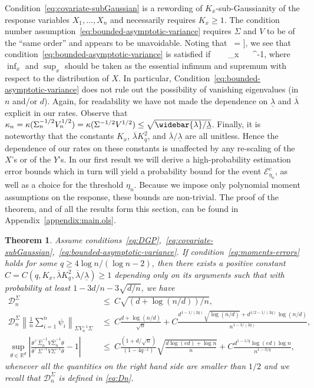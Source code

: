\documentclass{article}
\newtheorem{theorem}{Theorem}
\begin{document}
Condition~\ref{eq:covariate-subGaussian} is a rewording of $K_x$-sub-Gaussianity of the response variables $X_1, \ldots, X_n$ and necessarily requires $K_x \ge 1$. The condition number assumption~\ref{eq:bounded-asymptotic-variance} requires $\Sigma$ and $V$ to be of the ``same order'' and appears to be unavoidable.
Noting that
\ = \left\right],
\]
we see that condition~\ref{eq:bounded-asymptotic-variance} is satisfied if
\ ~\le~ \sup_{x} ~\le~ \underline{\lambda}^{-1},
\]
where $\inf_x$ and $\sup_x$ should be taken as the essential infimum and supremum with respect to the distribution of $X$.
In particular, Condition~\ref{eq:bounded-asymptotic-variance} does not rule out the possibility of vanishing eigenvalues (in $n$ and/or $d$). Again, for readability we have not made the dependence on $\underline{\lambda}$ and $\overline{\lambda}$ explicit in our rates. Observe that $\kappa_n = \kappa(\Sigma_n^{-1/2}V_n^{1/2}) = \kappa(\Sigma^{-1/2}V^{1/2}) \le \sqrt{\widebar{\lambda}/\underline{\lambda}}$.
Finally, it is noteworthy that the constants $K_x$, $\overline{\lambda} K_q^2$, and $\overline{\lambda}/\underline{\lambda}$ are all unitless. Hence the dependence of our rates on these constants is unaffected by any re-scaling of the $X$'s or of the $Y$'s.
In our first result we will derive a high-probability estimation error bounds which in turn will yield a probability bound for the event $\mathcal{E}^c_{\eta_n}$, as well as a choice for the threshold $\eta_n$. Because we impose only polynomial moment assumptions on the response, these bounds are non-trivial. The proof of the theorem, and of all the results form this section, can be found
in Appendix~\ref{appendix:main.ols}.
\begin{theorem}\label{thm:main-rates-thm-OLS-independence}
Assume conditions~\ref{eq:DGP},~\ref{eq:covariate-subGaussian},~\ref{eq:bounded-asymptotic-variance}. If condition~\ref{eq:moments-errors} holds for some $q \ge 4\log n/(\log n - 2)$, then there exists a positive constant $C = C(q, K_x, \overline{\lambda} K_q^2, \overline{\lambda}/\underline{\lambda}) \ge 1$ depending only on its arguments such that with probability at least $1 - 3d/n - 3\sqrt{d/n}$, we have
\begin{equation}\label{eq:main-quantity-bounds}
\begin{split}
\mathcal{D}_n^{\Sigma} ~&\le~ C\sqrt{(d + \log(n/d))/n},\\ \mathcal{D}_n^{\Sigma}\left\|\frac{1}{n}\sum_{i=1}^n \psi_i\right\|_{\Sigma V_n^{-1}\Sigma} ~&\le~ C\frac{d + \log(n/d)}{\sqrt{n}}
+ C\frac{d^{1-1/(2q)}\sqrt{\log(n/d)} + d^{1/2 - 1/(2q)}\log(n/d)}{n^{1-3/(2q)}},\\ \sup_{\theta\in\mathbb{R}^d}\left|\frac{\theta^{\top}\widehat{\Sigma}^{-1}_n\widehat{V}\widehat{\Sigma}_n^{-1}\theta}{\theta^{\top}\Sigma^{-1}V\Sigma^{-1}\theta} - 1\right| ~&\le~ C\frac{(1 + d/\sqrt{n})}{(1-4q^{-1})}\sqrt{\frac{d\log(ed) + \log n}{n}}
+ C\frac{d^{1-1/q}\log(ed)\log n}{n^{1-3/q}},
\end{split}
\end{equation}
whenever all the quantities on the right hand side are smaller than $1/2$ and we recall that $\mathcal{D}_n^{\Sigma}$ is defined in \eqref{eq:Dn}.
\end{theorem}
\end{document}
